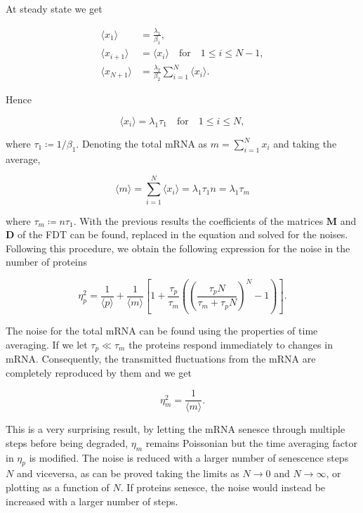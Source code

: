At steady state we get

\begin{equation*}
  \begin{split}
    \langle x_1\rangle &= \frac{\lambda_1}{\beta_1},\\
    \langle x_{i+1}\rangle &= \langle x_i\rangle\quad\text{for}\quad 1\leq i\leq N-1,\\
    \langle x_{N+1}\rangle &= \frac{\lambda_2}{\beta_2}\sum_{i=1}^N\langle x_i\rangle.
  \end{split}
\end{equation*}

Hence

\begin{equation*}
  \langle x_i\rangle = \lambda_1\tau_1\quad\text{for}\quad 1\leq i\leq N,
\end{equation*}

where $\tau_1 \coloneqq 1/\beta_1$. Denoting the total mRNA as $m=\sum_{i=1}^Nx_i$ and taking the average,

\begin{equation*}
  \langle m\rangle = \sum_{i=1}^N\langle x_i\rangle = \lambda_1\tau_1n = \lambda_1\tau_m
\end{equation*}

where $\tau_m\coloneqq n\tau_1$. With the previous results the coefficients of the matrices $\mathbf{M}$ and $\mathbf{D}$ of the FDT can be found, replaced in the equation and solved for the noises. Following this procedure, we obtain the following expression for the noise in the number of proteins

\begin{equation*}
  \eta_p^2= \frac{1}{\langle p\rangle}+\frac{1}{\langle m\rangle} \left[1+\frac{\tau_p}{\tau_m}\left(\left(\frac{\tau_pN}{\tau_m+\tau_pN}\right)^N-1\right)\right].
\end{equation*}

The noise for the total mRNA can be found using the properties of time averaging. If we let $\tau_p\ll\tau_m$ the proteins respond immediately to changes in mRNA. Consequently, the transmitted fluctuations from the mRNA are completely reproduced by them and we get

\begin{equation*}
  \eta_m^2 = \frac{1}{\langle m\rangle}.
\end{equation*}

This is a very surprising result, by letting the mRNA senesce through multiple steps before being degraded, $\eta_m$ remains Poissonian but the time averaging factor in $\eta_p$ is modified. The noise is reduced with a larger number of senescence steps $N$ and viceversa, as can be proved taking the limits as $N\to 0$ and $N\to \infty$, or plotting as a function of $N$. If proteins senesce, the noise would instead be increased with a larger number of steps.

